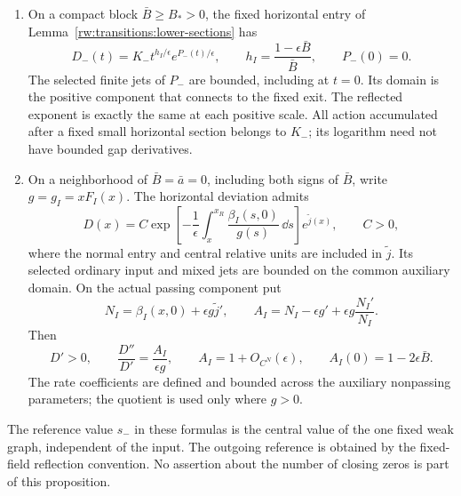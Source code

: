 \begin{proposition}
\begin{enumerate}[label=(\roman*),leftmargin=*]
\item On a compact block $\bar B\ge B_*>0$, the fixed horizontal
entry of Lemma~\ref{rw:transitions:lower-sections} has
\begin{equation}\label{rw:transitions:horizontal-power}
 D_-(t)=K_-t^{h_I/\epsilon}e^{P_-(t)/\epsilon},\qquad
 h_I=\frac{1-\epsilon\bar B}{\bar B},\qquad P_-(0)=0.
\end{equation}
The selected finite jets of $P_-$ are bounded, including at $t=0$.
Its domain is the positive component that connects to the fixed exit.
The reflected exponent is exactly the same at each positive scale.
All action accumulated after a fixed small horizontal section belongs
to $K_-$; its logarithm need not have bounded gap derivatives.

\item On a neighborhood of $\bar B=\bar a=0$, including both signs
of $\bar B$, write $g=g_I=xF_I(x)$. The horizontal deviation admits
\begin{equation}\label{rw:transitions:cubic-amplitude}
 D(x)=C\exp\left[-\frac1\epsilon
       \int_x^{x_R}\frac{\beta_I(s,0)}{g(s)}\,\dd s\right]
       e^{\widetilde j(x)},\qquad C>0,
\end{equation}
where the normal entry and central relative units are included in
$\widetilde j$. Its selected ordinary input and mixed jets are bounded
on the common auxiliary domain. On the actual passing component put
\begin{equation}\label{rw:transitions:cubic-rate}
 N_I=\beta_I(x,0)+\epsilon g\widetilde j',\qquad
 A_I=N_I-\epsilon g'+\epsilon g\frac{N_I'}{N_I}.
\end{equation}
Then
\[
 D'>0,\qquad \frac{D''}{D'}=\frac{A_I}{\epsilon g},\qquad
 A_I=1+O_{C^N}(\epsilon),\qquad A_I(0)=1-2\epsilon\bar B.
\]
The rate coefficients are defined and bounded across the auxiliary
nonpassing parameters; the quotient is used only where $g>0$.
\end{enumerate}
The reference value $s_-$ in these formulas is the central value of
the one fixed weak graph, independent of the input. The outgoing
reference is obtained by the fixed-field reflection convention.
No assertion about the number of closing zeros is part of this
proposition.
\end{proposition}

